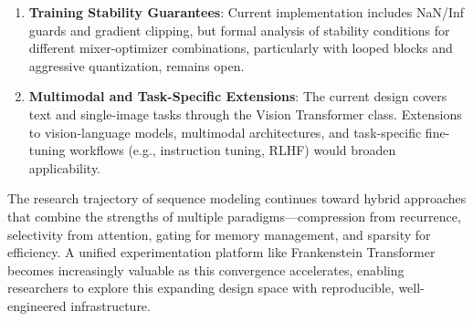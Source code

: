 \begin{enumerate}[leftmargin=*]
    \item \textbf{Training Stability Guarantees}: Current implementation includes NaN/Inf guards and gradient clipping, but formal analysis of stability conditions for different mixer-optimizer combinations, particularly with looped blocks and aggressive quantization, remains open.
    
    \item \textbf{Multimodal and Task-Specific Extensions}: The current design covers text and single-image tasks through the Vision Transformer class. Extensions to vision-language models, multimodal architectures, and task-specific fine-tuning workflows (e.g., instruction tuning, RLHF) would broaden applicability.
\end{enumerate}

The research trajectory of sequence modeling continues toward hybrid approaches that combine the strengths of multiple paradigms---compression from recurrence, selectivity from attention, gating for memory management, and sparsity for efficiency. A unified experimentation platform like Frankenstein Transformer becomes increasingly valuable as this convergence accelerates, enabling researchers to explore this expanding design space with reproducible, well-engineered infrastructure.

